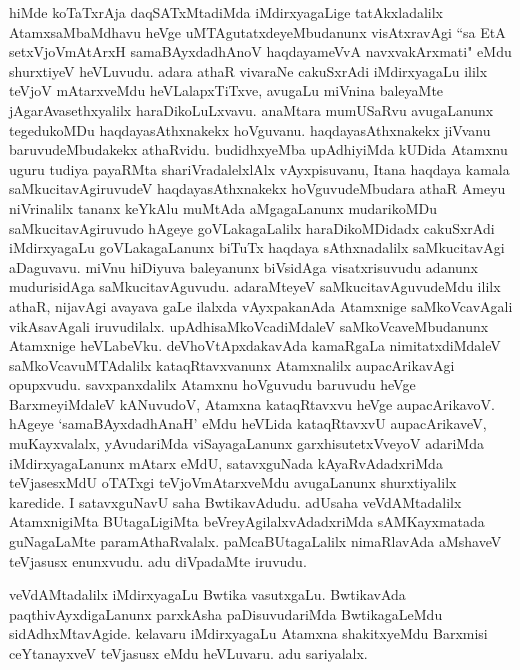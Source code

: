 \begin{artha}
hiMde koTaTxrAja daqSATxMtadiMda iMdirxyagaLige tatAkxladalilx AtamxsaMbaMdhavu heVge uMTAgutatxdeyeMbudanunx visAtxravAgi ``sa EtA setxVjoVmAtArxH samaBAyxdadhAnoV haqdayameVvA navxvakArxmati" eMdu shurxtiyeV heVLuvudu. adara athaR vivaraNe cakuSxrAdi iMdirxyagaLu ililx teVjoV mAtarxveMdu heVLalapxTiTxve, avugaLu miVnina baleyaMte jAgarAvasethxyalilx haraDikoLuLxvavu. anaMtara mumUSaRvu avugaLanunx tegedukoMDu haqdayasAthxnakekx hoVguvanu. haqdayasAthxnakekx jiVvanu baruvudeMbudakekx athaRvidu. budidhxyeMba upAdhiyiMda kUDida Atamxnu uguru tudiya payaRMta shariVradalelxlAlx vAyxpisuvanu, Itana haqdaya kamala saMkucitavAgiruvudeV haqdayasAthxnakekx hoVguvudeMbudara athaR Ameyu niVrinalilx tananx keYkAlu muMtAda aMgagaLanunx mudarikoMDu saMkucitavAgiruvudo hAgeye goVLakagaLalilx haraDikoMDidadx cakuSxrAdi iMdirxyagaLu goVLakagaLanunx biTuTx haqdaya sAthxnadalilx saMkucitavAgi aDaguvavu. miVnu hiDiyuva baleyanunx biVsidAga visatxrisuvudu adanunx mudurisidAga saMkucitavAguvudu. adaraMteyeV saMkucitavAguvudeMdu ililx athaR, nijavAgi avayava gaLe ilalxda vAyxpakanAda Atamxnige saMkoVcavAgali vikAsavAgali iruvudilalx. upAdhisaMkoVcadiMdaleV saMkoVcaveMbudanunx Atamxnige heVLabeVku. deVhoVtApxdakavAda kamaRgaLa nimitatxdiMdaleV saMkoVcavuMTAdalilx kataqRtavxvanunx Atamxnalilx aupacArikavAgi opupxvudu. savxpanxdalilx Atamxnu hoVguvudu baruvudu heVge BarxmeyiMdaleV kANuvudoV, Atamxna kataqRtavxvu heVge aupacArikavoV. hAgeye `samaBAyxdadhAnaH' eMdu heVLida kataqRtavxvU aupacArikaveV, muKayxvalalx, yAvudariMda viSayagaLanunx garxhisutetxVveyoV adariMda iMdirxyagaLanunx mAtarx eMdU, satavxguNada kAyaRvAdadxriMda teVjasesxMdU oTATxgi teVjoVmAtarxveMdu avugaLanunx shurxtiyalilx karedide. I satavxguNavU saha BwtikavAdudu. adUsaha veVdAMtadalilx AtamxnigiMta BUtagaLigiMta beVreyAgilalxvAdadxriMda sAMKayxmatada guNagaLaMte paramAthaRvalalx. paMcaBUtagaLalilx nimaRlavAda aMshaveV teVjasusx enunxvudu. adu diVpadaMte iruvudu. 
\end{artha}

\begin{artha}
veVdAMtadalilx iMdirxyagaLu Bwtika vasutxgaLu. BwtikavAda paqthivAyxdigaLanunx parxkAsha paDisuvudariMda BwtikagaLeMdu sidAdhxMtavAgide. kelavaru iMdirxyagaLu Atamxna shakitxyeMdu Barxmisi ceYtanayxveV teVjasusx eMdu heVLuvaru. adu sariyalalx. 
\end{artha}

